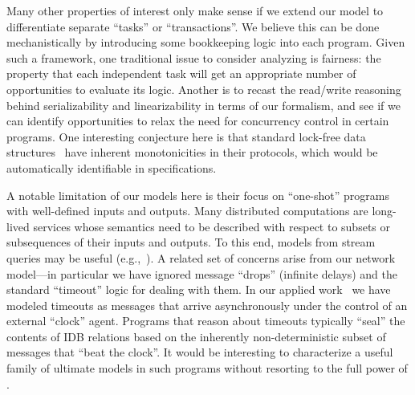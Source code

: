 Many other properties of interest only make sense if we extend our model to differentiate separate ``tasks'' or ``transactions''. We believe this can be done mechanistically by introducing some bookkeeping logic into each \lang program.  Given such a framework, one traditional issue to consider analyzing is fairness: the property that each independent task will get an appropriate number of opportunities to evaluate its logic.  Another is to recast the read/write reasoning behind serializability and linearizability in terms of our formalism, and see if we can identify opportunities to relax the need for concurrency control in certain programs.  One interesting conjecture here is that standard lock-free data structures~\cite{lockfree} have inherent monotonicities in their protocols, which would be automatically identifiable in \lang specifications.

A notable limitation of our models here is their focus on ``one-shot'' programs with well-defined inputs and outputs.  Many distributed computations are long-lived services whose semantics need to be described with respect to subsets or subsequences of their inputs and outputs.  To this end, models from stream queries may be useful (e.g.,~\cite{Chandramouli2009}).  A related set of concerns arise from our network model---in particular we have ignored message ``drops'' (infinite delays) and the standard ``timeout'' logic for dealing with them.  In our applied work~\cite{overlog,cidr11} we have modeled timeouts as messages that arrive asynchronously under the control of an external ``clock'' agent.  Programs that reason about timeouts typically ``seal'' the contents of IDB relations based on the inherently non-deterministic subset of messages that ``beat the clock''.  It would be interesting to characterize a useful family of ultimate models in such programs without resorting to the full power of \lang.